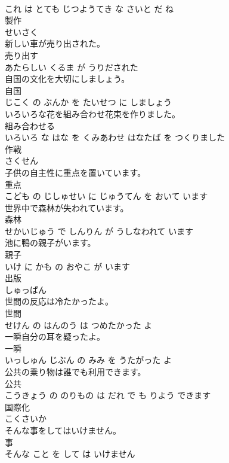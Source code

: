 \documentclass[8pt]{extreport}
\begin{document}
\begin{CJK}{UTF8}{min}
\\	これ は とても じつようてき な さいと だ ね		
\\	製作	
\\	せいさく		
\\	新しい車が売り出された。	
\\	売り出す 
\\	あたらしい くるま が うりだされた		
\\	自国の文化を大切にしましょう。	
\\	自国 
\\	じこく の ぶんか を たいせつ に しましょう		
\\	いろいろな花を組み合わせ花束を作りました。	
\\	組み合わせる 
\\	いろいろ な はな を くみあわせ はなたば を つくりました		
\\	作戦	
\\	さくせん		
\\	子供の自主性に重点を置いています。	
\\	重点 
\\	こども の じしゅせい に じゅうてん を おいて います		
\\	世界中で森林が失われています。	
\\	森林 
\\	せかいじゅう で しんりん が うしなわれて います		
\\	池に鴨の親子がいます。	
\\	親子 
\\	いけ に かも の おやこ が います		
\\	出版	
\\	しゅっぱん		
\\	世間の反応は冷たかったよ。	
\\	世間 
\\	せけん の はんのう は つめたかった よ		
\\	一瞬自分の耳を疑ったよ。	
\\	一瞬 
\\	いっしゅん じぶん の みみ を うたがった よ		
\\	公共の乗り物は誰でも利用できます。	
\\	公共 
\\	こうきょう の のりもの は だれ で も りよう できます		
\\	国際化	
\\	こくさいか		
\\	そんな事をしてはいけません。	
\\	事 
\\	そんな こと を して は いけません		

\end{CJK}
\end{document}
